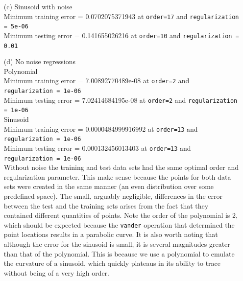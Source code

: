 \documentclass{article}
\begin{document}
\begin{enumerate}
\bigskip

	\item[(c)]Sinusoid with noise\\
	
		Minimum training error = 0.0702075371943 at \texttt{order=17} and \texttt{regularization = 5e-06}\\
		Minimum testing error =  0.141655026216 at \texttt{order=10} and \texttt{regularization = 0.01}

\bigskip

	\item[(d)] No noise regressions\\
	
		Polynomial\\
			Minimum training error = 7.00892770489e-08 at \texttt{order=2} and \texttt{regularization = 1e-06}\\
			Minimum testing error =  7.02414684195e-08 at \texttt{order=2} and \texttt{regularization = 1e-06}\\
			
	Sinusoid\\
		Minimum training error = 0.0000484999916992 at \texttt{order=13} and \texttt{regularization = 1e-06}\\
		Minimum testing error =  0.000132456013403 at \texttt{order=13} and \texttt{regularization = 1e-06}\\
		
		Without noise the training and test data sets had the same optimal order and regularization parameter. This make sense because the points for both data sets were created in the same manner (an even distribution over some predefined space). The small, arguably negligible, differences in the error between the test and the training sets arises from the fact that they contained different quantities of points. Note the order of the polynomial is 2, which should be expected because the \texttt{vander} operation that determined the point locations results in a parabolic curve. It is also worth noting that although the error for the sinusoid is small, it is several magnitudes greater than that of the polynomial. This is because we use a polynomial to emulate the curvature of a sinusoid, which quickly plateaus in its ability to trace without being of a very high order.
\end{enumerate}
\end{document}
